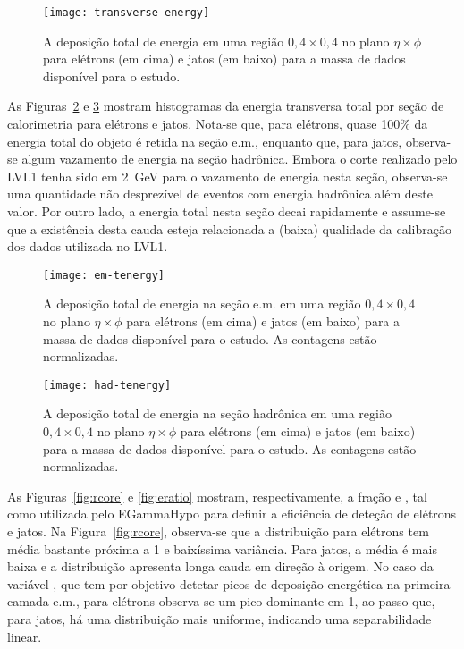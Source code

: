 \begin{figure}
\begin{center}
\texttt{[image: transverse-energy]}
\end{center}
\caption{A deposição total de energia em uma região $0,4 \times 0,4$ no plano
$\eta\times\phi$ para elétrons (em cima) e jatos (em baixo) para a massa de
dados disponível para o estudo.}
\label{fig:transverse-energy}
\end{figure}

As Figuras~\ref{fig:em-tenergy} e \ref{fig:had-tenergy} mostram histogramas da
energia transversa total por seção de calorimetria para e\-lé\-trons e
jatos. Nota-se que, para elétrons, quase 100\% da energia total do objeto é
retida na seção e.m., enquanto que, para jatos, observa-se algum vazamento de
energia na seção hadrônica. Embora o corte realizado pelo LVL1 tenha sido em
2~GeV para o vazamento de energia nesta seção, observa-se uma quantidade não
desprezível de eventos com energia hadrônica além deste valor. Por outro lado,
a energia total nesta seção decai rapidamente e assume-se que a existência
desta cauda esteja relacionada a (baixa) qualidade da calibração dos dados
utilizada no LVL1.

\begin{figure}
\begin{center}
\texttt{[image: em-tenergy]}
\end{center}
\caption{A deposição total de energia na seção e.m. em uma região $0,4 \times
0,4$ no plano $\eta\times\phi$ para elétrons (em cima) e jatos (em baixo) para
a massa de dados disponível para o estudo. As contagens estão normalizadas.}
\label{fig:em-tenergy}
\end{figure}

\begin{figure}
\begin{center}
\texttt{[image: had-tenergy]}
\end{center}
\caption{A deposição total de energia na seção hadrônica em uma região $0,4 \times
0,4$ no plano $\eta\times\phi$ para elétrons (em cima) e jatos (em baixo) para
a massa de dados disponível para o estudo. As contagens estão normalizadas.}
\label{fig:had-tenergy}
\end{figure}

As Figuras~\ref{fig:rcore} e \ref{fig:eratio} mostram, respectivamente, a
fração \rcore e \eratio, tal como utilizada pelo EGammaHypo para definir a
eficiência de deteção de elétrons e jatos. Na Figura~\ref{fig:rcore},
observa-se que a distribuição para elétrons tem média bastante próxima a 1 e
baixíssima variância. Para jatos, a média é mais baixa e a distribuição
apresenta longa cauda em direção à origem. No caso da variável \eratio, que
tem por objetivo detetar picos de deposição energética na primeira camada
e.m., para elétrons observa-se um pico dominante em 1, ao passo que, para
jatos, há uma distribuição mais uniforme, indicando uma separabilidade
linear.

